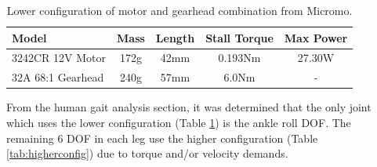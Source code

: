 \begin{table}[!h]
  \centering
  \caption{Lower configuration of motor and gearhead combination from Micromo.}
    \begin{tabular}{lcccc}
    \addlinespace
    \toprule
    \textbf{Model} & \textbf{Mass} & \textbf{Length} & \textbf{Stall Torque} & \textbf{Max Power}\\
    \midrule
    3242CR 12V Motor	&	172g	&	42mm	&	0.193Nm		&	27.30W	\\
    32A 68:1 Gearhead	&	240g	&	57mm	&	6.0Nm		&	-	\\
    \bottomrule
    \end{tabular}%
  \label{tab:lowerconfig}%
\end{table}%


From the human gait analysis section, it was determined that the only joint which uses the lower configuration (Table \ref{tab:lowerconfig}) is the ankle roll DOF. The remaining 6 DOF in each leg use the higher configuration (Table \ref{tab:higherconfig}) due to torque and/or velocity demands.



